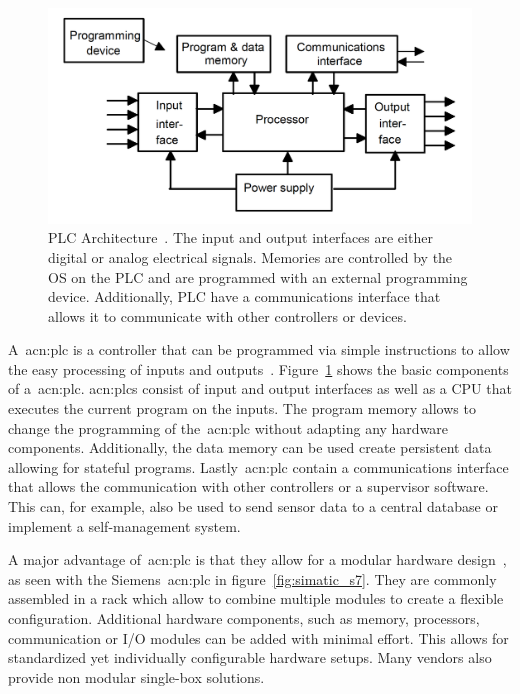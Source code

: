 \begin{figure}
    \includegraphics[width=\textwidth]{Figures/PLC_Architecture.png}
    \caption[PLC Architecture]{
       PLC Architecture~\cite[p.~4]{BOLTON200653}.
    The input and output interfaces are either digital or analog electrical signals.
    Memories are controlled by the OS on the PLC and are programmed with an external programming device.
    Additionally, PLC have a communications interface that allows it to communicate with other controllers or devices.}
    \label{fig:plc_architecture}
\end{figure}

A~\acrfull{acn:plc} is a controller that can be programmed via simple instructions to allow the easy processing of inputs and outputs~\cite[p.~4]{BOLTON200653}.
Figure~\ref{fig:plc_architecture} shows the basic components of a~\acrshort{acn:plc}.
\acrshort{acn:plc}s consist of input and output interfaces as well as a CPU that executes the current program on the inputs.
The program memory allows to change the programming of  the~\acrshort{acn:plc} without adapting any hardware components.
Additionally, the data memory can be used create persistent data allowing for stateful programs.
Lastly~\acrshort{acn:plc} contain a communications interface that allows the communication with other controllers or a supervisor software.
This can, for example, also be used to send sensor data to a central database or implement a self-management system.

A major advantage of~\acrshort{acn:plc} is that they allow for a modular hardware design~\cite[p.~12]{BOLTON200653}, as seen with the Siemens~\acrshort{acn:plc} in figure~\ref{fig:simatic_s7}.
They are commonly assembled in a rack which allow to combine multiple modules to create a flexible configuration.
Additional hardware components, such as memory, processors, communication or I/O modules can be added with minimal effort.
This allows for standardized yet individually configurable hardware setups.
Many vendors also provide non modular single-box solutions.

